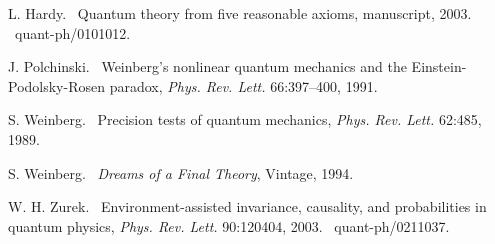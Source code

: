 \documentclass[12pt]{article}%
\begin{document}
\begin{thebibliography}{9}
L. Hardy. \ Quantum theory from five reasonable axioms,
manuscript, 2003. \ quant-ph/0101012.

J. Polchinski. \ Weinberg's nonlinear quantum mechanics
and the Einstein-Podolsky-Rosen paradox, \textit{Phys. Rev. Lett.}
66:397--400, 1991.

S. Weinberg. \ Precision tests of quantum mechanics,
\textit{Phys. Rev. Lett.} 62:485, 1989.

S. Weinberg. \ \textit{Dreams of a Final Theory}, Vintage, 1994.

W. H. Zurek. \ Environment-assisted invariance, causality, and
probabilities in quantum physics, \textit{Phys. Rev. Lett.} 90:120404, 2003. \ quant-ph/0211037.
\end{thebibliography}
\end{document}
